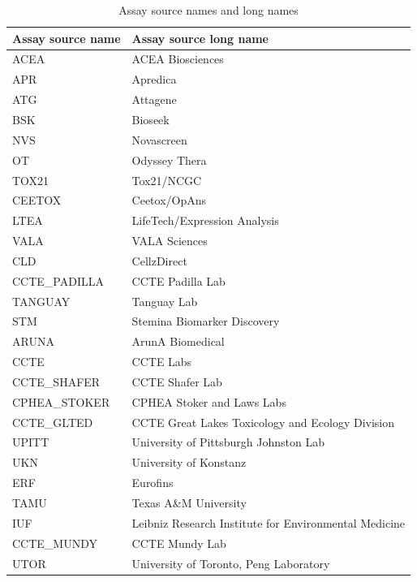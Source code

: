 \begin{table}[h]
    \centering
    \caption{Assay source names and long names}
    \small %
    \begin{tabular}{ll}
        \toprule
        Assay source name & Assay source long name \\
        \midrule
        ACEA & ACEA Biosciences \\
        APR & Apredica \\
        ATG & Attagene \\
        BSK & Bioseek \\
        NVS & Novascreen \\
        OT & Odyssey Thera \\
        TOX21 & Tox21/NCGC \\
        CEETOX & Ceetox/OpAns \\
        LTEA & LifeTech/Expression Analysis \\
        VALA & VALA Sciences \\
        CLD & CellzDirect \\
        CCTE\_PADILLA & CCTE Padilla Lab \\
        TANGUAY & Tanguay Lab \\
        STM & Stemina Biomarker Discovery \\
        ARUNA & ArunA Biomedical \\
        CCTE & CCTE Labs \\
        CCTE\_SHAFER & CCTE Shafer Lab \\
        CPHEA\_STOKER & CPHEA Stoker and Laws Labs \\
        CCTE\_GLTED & CCTE Great Lakes Toxicology and Ecology Division \\
        UPITT & University of Pittsburgh Johnston Lab \\
        UKN & University of Konstanz \\
        ERF & Eurofins \\
        TAMU & Texas A\&M University \\
        IUF & Leibniz Research Institute for Environmental Medicine \\
        CCTE\_MUNDY & CCTE Mundy Lab \\
        UTOR & University of Toronto, Peng Laboratory \\
        \bottomrule
    \end{tabular}
    \label{tab:laboratories}
\end{table}



\clearpage